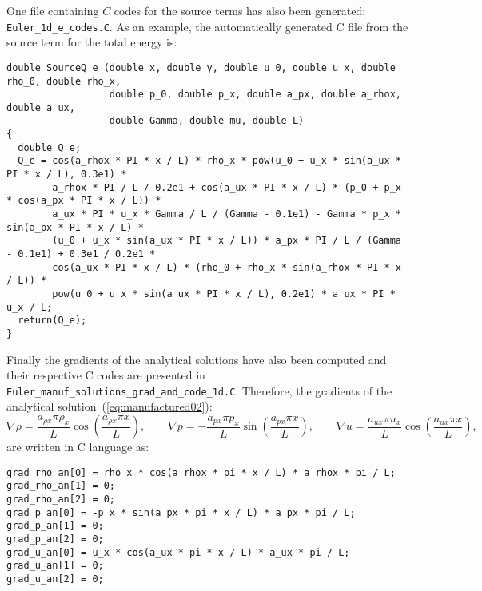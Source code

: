 \documentclass[10pt]{article}
\begin{document}
One file containing  $C$ codes for the source terms has also been generated:  \texttt{Euler\_1d\_e\_codes.C}. As an example, the automatically generated C file from the source term for the total energy is:
\begin{verbatim}
double SourceQ_e (double x, double y, double u_0, double u_x, double rho_0, double rho_x,
                  double p_0, double p_x, double a_px, double a_rhox, double a_ux,
                  double Gamma, double mu, double L)
{
  double Q_e;
  Q_e = cos(a_rhox * PI * x / L) * rho_x * pow(u_0 + u_x * sin(a_ux * PI * x / L), 0.3e1) *
        a_rhox * PI / L / 0.2e1 + cos(a_ux * PI * x / L) * (p_0 + p_x * cos(a_px * PI * x / L)) *
        a_ux * PI * u_x * Gamma / L / (Gamma - 0.1e1) - Gamma * p_x * sin(a_px * PI * x / L) *
        (u_0 + u_x * sin(a_ux * PI * x / L)) * a_px * PI / L / (Gamma - 0.1e1) + 0.3e1 / 0.2e1 *
        cos(a_ux * PI * x / L) * (rho_0 + rho_x * sin(a_rhox * PI * x / L)) *
        pow(u_0 + u_x * sin(a_ux * PI * x / L), 0.2e1) * a_ux * PI * u_x / L;
  return(Q_e);
}
\end{verbatim}

Finally the gradients of the analytical solutions have also been computed and their respective C codes are presented in \texttt{Euler\_manuf\_solutions\_grad\_and\_code\_1d.C}. Therefore, the gradients of the analytical solution~(\ref{eq:manufactured02}):
\begin{equation}
\nabla \rho =  \dfrac{a_{\rho x} \pi \rho_x}{L}  \cos\left( \dfrac{a_{\rho x} \pi x}{L} \right),
\qquad
\nabla p = -\dfrac{a_{px} \pi p_x }{L} \sin\left( \dfrac{a_{px} \pi x}{L} \right) ,
\qquad
\nabla u =  \dfrac{a_{ux} \pi u_x }{L}  \cos\left( \dfrac{a_{ux} \pi x}{L} \right),
\end{equation}
are written in C language as:

\begin{verbatim}
grad_rho_an[0] = rho_x * cos(a_rhox * pi * x / L) * a_rhox * pi / L;
grad_rho_an[1] = 0;
grad_rho_an[2] = 0;
grad_p_an[0] = -p_x * sin(a_px * pi * x / L) * a_px * pi / L;
grad_p_an[1] = 0;
grad_p_an[2] = 0;
grad_u_an[0] = u_x * cos(a_ux * pi * x / L) * a_ux * pi / L;
grad_u_an[1] = 0;
grad_u_an[2] = 0;
\end{verbatim}

 

\end{document}
